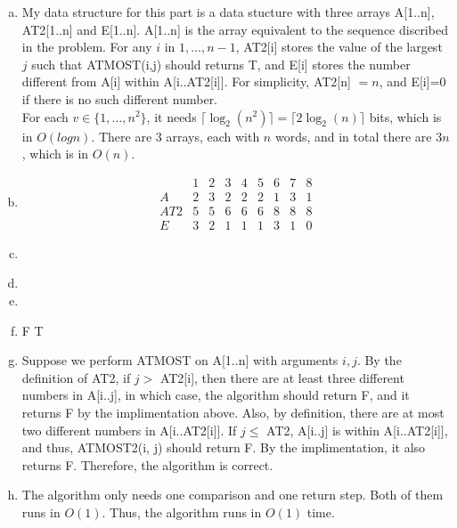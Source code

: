 \documentclass[10pt]{article}
\begin{document}
\begin{enumerate}[a.]
	\item %
		My data structure for this part is a data stucture with three arrays
		A[1..n], AT2[1..n] and E[1..n]. 
		A[1..n] is the array equivalent to the sequence discribed in the
		problem. 
		For any $i$ in $1, \ldots, n-1$, AT2[i] stores the value of the largest
		$j$ such that ATMOST(i,j) should returns T, and E[i] stores the number
		different from A[i] within A[i..AT2[i]]. 
		For simplicity, AT2[n] $= n$, and E[i]=0 if there is no such different
		number. \\

		For each $v \in \{1, \ldots, n^2\}$, it needs $\lceil \log_2(n^2)
		\rceil = \lceil 2\log_2(n) \rceil$ bits, which is in $O(log n)$. 
		There are 3 arrays, each with $n$ words, and in total there are $3n$,
		which is in $O(n)$. 

	\item %
		$$
		\begin{matrix}
				& 1 & 2 & 3 & 4 & 5 & 6 & 7 & 8 \\
			\hline
			A	& 2 & 3 & 2 & 2 & 2 & 1 & 3 & 1 \\
			AT2	& 5 & 5 & 6 & 6 & 6 & 8 & 8 & 8 \\
			E	& 3 & 2 & 1 & 1 & 1 & 3 & 1 & 0
		\end{matrix}
		$$
	\item %
		\begin{algorithmic}[1]
				
			\EndFunction
		\end{algorithmic}
	\item %
	\item %
	\item %
		\begin{algorithmic}[1]
					\State \Return F
				\Else
					\State \Return T
				\EndIf
			\EndFunction
		\end{algorithmic}
	\item %
		Suppose we perform ATMOST on A[1..n] with arguments $i, j$. By the
		definition of AT2, if $j >$ AT2[i], then there are at least three
		different numbers in A[i..j], in which case, the algorithm should
		return F, and it returns F by the implimentation above. Also, by
		definition, there are at most two different numbers in A[i..AT2[i]]. If
		$j \leq$ AT2, A[i..j] is within A[i..AT2[i]], and thus, ATMOST2(i, j)
		should return F. By the implimentation, it also returns F. Therefore,
		the algorithm is correct. 

	\item %
		The algorithm only needs one comparison and one return step. Both of
		them runs in $O(1)$. Thus, the algorithm runs in $O(1)$ time.

\end{enumerate}		
		
\end{document}
